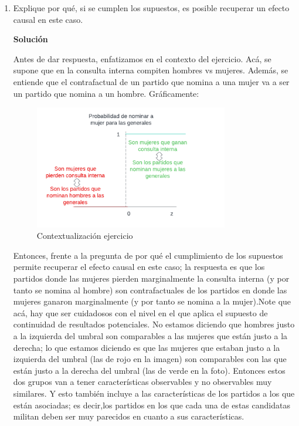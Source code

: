 \documentclass[a4paper, answers, addpoints, 11pt]{exam}
\newenvironment{solucion}{%
  \begin{mdframed}[
    backgroundcolor=blue!5,    %
    linecolor=blue!50,          %
    linewidth=2pt,              %
    leftmargin=10pt,            %
    rightmargin=8pt,           %
    topline=true,              %
    bottomline=true,            %
    roundcorner=10pt,           %
    innerleftmargin=10pt,       %
    innerrightmargin=10pt,      %
    innerbottommargin=10pt,     %
    innertopmargin=10pt         %
  ]%
  \begin{tcolorbox}[colframe=blue!50!black, colback=blue!50, coltitle=white, sharp corners=all, boxrule=1mm, width=\textwidth, halign=left, valign=center, top=0mm, bottom=0mm, left=0mm, right=0mm] \textbf{Solución} \end{tcolorbox} }{\end{mdframed}}
\begin{document}
\begin{enumerate}
\begin{enumerate}
\begin{solucion}
\end{solucion}
            \item Explique por qué, si se cumplen los supuestos, es posible recuperar un efecto causal en este caso. 
            \begin{solucion}
            Antes de dar respuesta, enfatizamos en el contexto del ejercicio. Acá, se supone que en la consulta interna compiten hombres vs mujeres. Además, se entiende que el contrafactual de un partido que nomina a una mujer va a ser un partido que nomina a un hombre.   Gráficamente:
\begin{figure}[H]
    \centering
    \includegraphics[width=0.8\textwidth]{output/fotocontexto.png}
    \caption{Contextualización ejercicio}
    \label{fig:rdplot}
\end{figure}
Entonces, frente a la pregunta de por qué el cumplimiento de los supuestos permite recuperar el efecto causal en este caso; la respuesta es que los partidos donde las mujeres pierden marginalmente la consulta interna (y por tanto se nomina al hombre) son contrafactuales de los partidos en donde las mujeres ganaron marginalmente (y por tanto se nomina a la mujer).Note que acá, hay que ser cuidadosos con el nivel en el que aplica el supuesto de continuidad de resultados potenciales. No estamos diciendo que hombres justo a la izquierda del umbral son comparables a las mujeres que están justo a la derecha; lo que estamos diciendo es que las mujeres que estaban justo a la izquierda del umbral (las de rojo en la imagen) son comparables con las que están justo a la derecha del umbral (las de verde en la foto). Entonces estos dos grupos van a tener características observables y no observables muy similares. Y esto también incluye a las características de los partidos a los que están asociadas; es decir,los partidos en los que cada una de estas candidatas militan deben ser muy parecidos en cuanto a sus características.\\

\end{solucion}
\end{enumerate}
\end{enumerate}
\end{document}
